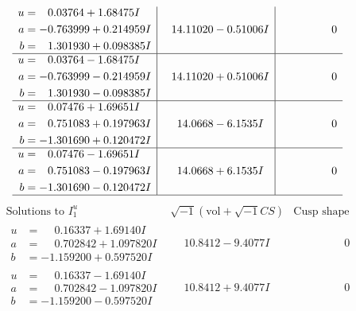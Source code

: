\documentclass[1p]{elsarticle_modified}
\theoremstyle{definition}
\newcommand{\I}{\sqrt{-1}}
\begin{document}
$$\begin{array}{c|c|c}
\begin{aligned}
u &= \phantom{-}0.03764 + 1.68475 I \\
a &= -0.763999 + 0.214959 I \\
b &= \phantom{-}1.301930 + 0.098385 I\end{aligned}
 & \phantom{-}14.11020 - 0.51006 I & \phantom{-0.000000 } 0 \\ \hline\begin{aligned}
u &= \phantom{-}0.03764 - 1.68475 I \\
a &= -0.763999 - 0.214959 I \\
b &= \phantom{-}1.301930 - 0.098385 I\end{aligned}
 & \phantom{-}14.11020 + 0.51006 I & \phantom{-0.000000 } 0 \\ \hline\begin{aligned}
u &= \phantom{-}0.07476 + 1.69651 I \\
a &= \phantom{-}0.751083 + 0.197963 I \\
b &= -1.301690 + 0.120472 I\end{aligned}
 & \phantom{-}14.0668 - 6.1535 I & \phantom{-0.000000 } 0 \\ \hline\begin{aligned}
u &= \phantom{-}0.07476 - 1.69651 I \\
a &= \phantom{-}0.751083 - 0.197963 I \\
b &= -1.301690 - 0.120472 I\end{aligned}
 & \phantom{-}14.0668 + 6.1535 I & \phantom{-0.000000 } 0\\
 \hline 
 \end{array}$$\newpage$$\begin{array}{c|c|c}  
\text{Solutions to }I^u_{1}& \I (\text{vol} + \sqrt{-1}CS) & \text{Cusp shape}\\
 \hline 
\begin{aligned}
u &= \phantom{-}0.16337 + 1.69140 I \\
a &= \phantom{-}0.702842 + 1.097820 I \\
b &= -1.159200 + 0.597520 I\end{aligned}
 & \phantom{-}10.8412 - 9.4077 I & \phantom{-0.000000 } 0 \\ \hline\begin{aligned}
u &= \phantom{-}0.16337 - 1.69140 I \\
a &= \phantom{-}0.702842 - 1.097820 I \\
b &= -1.159200 - 0.597520 I\end{aligned}
 & \phantom{-}10.8412 + 9.4077 I & \phantom{-0.000000 } 0 \\ \hline\begin{aligned}

\end{aligned}
\end{array}$$
\end{document}
